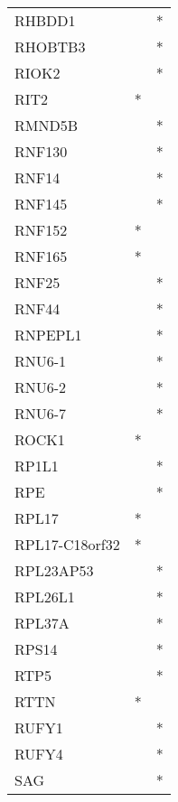 \begin{longtable}{lcc}
RHBDD1          &                &          * \\
RHOBTB3         &                &          * \\
RIOK2           &                &          * \\
RIT2            &              * &            \\
RMND5B          &                &          * \\
RNF130          &                &          * \\
RNF14           &                &          * \\
RNF145          &                &          * \\
RNF152          &              * &            \\
RNF165          &              * &            \\
RNF25           &                &          * \\
RNF44           &                &          * \\
RNPEPL1         &                &          * \\
RNU6-1          &                &          * \\
RNU6-2          &                &          * \\
RNU6-7          &                &          * \\
ROCK1           &              * &            \\
RP1L1           &                &          * \\
RPE             &                &          * \\
RPL17           &              * &            \\
RPL17-C18orf32  &              * &            \\
RPL23AP53       &                &          * \\
RPL26L1         &                &          * \\
RPL37A          &                &          * \\
RPS14           &                &          * \\
RTP5            &                &          * \\
RTTN            &              * &            \\
RUFY1           &                &          * \\
RUFY4           &                &          * \\
SAG             &                &          * \\

\end{longtable}
